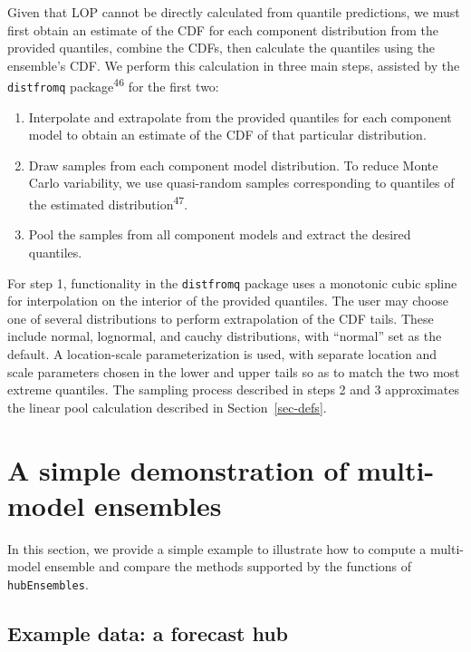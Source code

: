 \documentclass[
  letterpaper,
  DIV=11,
  numbers=noendperiod]{scrartcl}
\providecommand{\tightlist}{%
  \setlength{\itemsep}{0pt}\setlength{\parskip}{0pt}}\usepackage{longtable,booktabs,array}
\begin{document}
Given that LOP cannot be directly calculated from quantile predictions,
we must first obtain an estimate of the CDF for each component
distribution from the provided quantiles, combine the CDFs, then
calculate the quantiles using the ensemble's CDF. We perform this
calculation in three main steps, assisted by the \texttt{distfromq}
package\textsuperscript{46} for the first two:

\begin{enumerate}
\def\labelenumi{\arabic{enumi}.}
\tightlist
\item
  Interpolate and extrapolate from the provided quantiles for each
  component model to obtain an estimate of the CDF of that particular
  distribution.
\item
  Draw samples from each component model distribution. To reduce Monte
  Carlo variability, we use quasi-random samples corresponding to
  quantiles of the estimated distribution\textsuperscript{47}.
\item
  Pool the samples from all component models and extract the desired
  quantiles.
\end{enumerate}

For step 1, functionality in the \texttt{distfromq} package uses a
monotonic cubic spline for interpolation on the interior of the provided
quantiles. The user may choose one of several distributions to perform
extrapolation of the CDF tails. These include normal, lognormal, and
cauchy distributions, with ``normal'' set as the default. A
location-scale parameterization is used, with separate location and
scale parameters chosen in the lower and upper tails so as to match the
two most extreme quantiles. The sampling process described in steps 2
and 3 approximates the linear pool calculation described in
Section~\ref{sec-defs}.

\section{A simple demonstration of multi-model
ensembles}\label{sec-simple-ex}

In this section, we provide a simple example to illustrate how to
compute a multi-model ensemble and compare the methods supported by the
functions of \texttt{hubEnsembles}.

\subsection{Example data: a forecast
hub}\label{example-data-a-forecast-hub}
\end{document}
